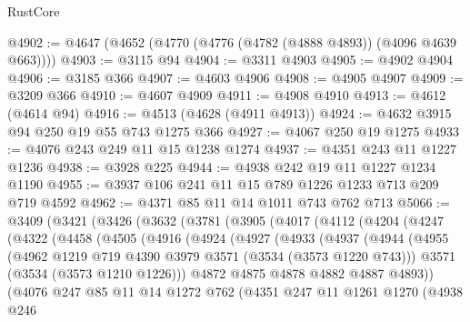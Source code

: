 \begin{lexlean}{RustCore}
\begin{coremodule}
@4902 := @4647 (@4652 (@4770 (@4776 (@4782 (@4888 @4893)) (@4096 @4639 @663))))
@4903 := @3115 @94
@4904 := @3311 @4903
@4905 := @4902 @4904
@4906 := @3185 @366
@4907 := @4603 @4906
@4908 := @4905 @4907
@4909 := @3209 @366
@4910 := @4607 @4909
@4911 := @4908 @4910
@4913 := @4612 (@4614 @94)
@4916 := @4513 (@4628 (@4911 @4913))
@4924 := @4632 @3915 @94 @250 @19 @55 @743 @1275 @366
@4927 := @4067 @250 @19 @1275
@4933 := @4076 @243 @249 @11 @15 @1238 @1274
@4937 := @4351 @243 @11 @1227 @1236
@4938 := @3928 @225
@4944 := @4938 @242 @19 @11 @1227 @1234 @1190
@4955 := @3937 @106 @241 @11 @15 @789 @1226 @1233 @713 @209 @719 @4592
@4962 := @4371 @85 @11 @14 @1011 @743 @762 @713
@5066 := @3409
    (@3421
      (@3426
        (@3632
          (@3781
            (@3905
              (@4017
                (@4112
                  (@4204
                    (@4247
                      (@4322
                        (@4458
                          (@4505
                            (@4916
                              (@4924
                                (@4927
                                  (@4933
                                    (@4937
                                      (@4944
                                        (@4955
                                          (@4962
                                            @1219
                                            @719
                                            @4390
                                            @3979
                                            @3571
                                            (@3534 (@3573 @1220 @743)))
                                          @3571
                                          (@3534 (@3573 @1210 @1226)))
                                        @4872
                                        @4875
                                        @4878
                                        @4882
                                        @4887
                                        @4893))
                                    (@4076
                                      @247
                                      @85
                                      @11
                                      @14
                                      @1272
                                      @762
                                      (@4351
                                        @247
                                        @11
                                        @1261
                                        @1270
                                        (@4938
                                          @246

\end{coremodule}
\end{lexlean}
